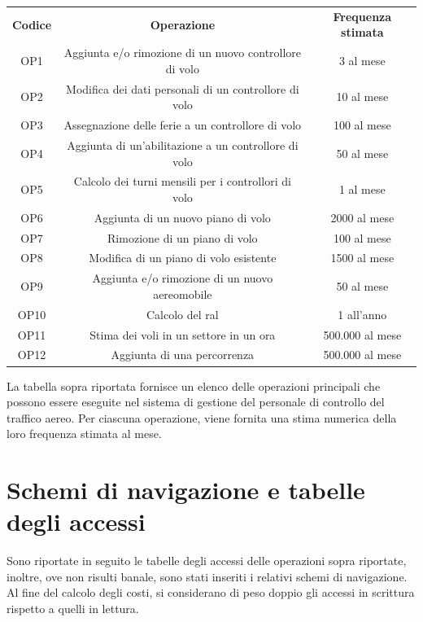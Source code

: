   \begin{table}[H]
  \centering
  \begin{tabular}{ccc}
  \rowcolor{tableheadercolor}
  \textbf{Codice} & \textbf{Operazione} & \textbf{Frequenza stimata} \\

  OP1 & Aggiunta e/o rimozione di un nuovo controllore di volo & 3 al mese \\
  OP2 & Modifica dei dati personali di un controllore di volo & 10 al mese \\
  OP3 & Assegnazione delle ferie a un controllore di volo & 100 al mese \\
  OP4 & Aggiunta di un'abilitazione a un controllore di volo & 50 al mese \\
  OP5 & Calcolo dei turni mensili per i controllori di volo & 1 al mese \\
  OP6 & Aggiunta di un nuovo piano di volo & 2000 al mese \\
  OP7 & Rimozione di un piano di volo & 100 al mese \\
  OP8 & Modifica di un piano di volo esistente & 1500 al mese \\
  OP9 & Aggiunta e/o rimozione di un nuovo aereomobile & 50 al mese \\
  OP10 & Calcolo del ral & 1 all'anno \\
  OP11 & Stima dei voli in un settore in un ora & 500.000 al mese \\
  OP12 & Aggiunta di una percorrenza & 500.000 al mese \\


  \end{tabular}
  \end{table}
  
  La tabella sopra riportata fornisce un elenco delle operazioni principali che possono essere eseguite nel sistema di gestione del personale di controllo del traffico aereo. Per ciascuna operazione, viene fornita una stima numerica della loro frequenza stimata al mese.
\section{Schemi di navigazione e tabelle degli accessi}
Sono riportate in seguito le tabelle degli accessi delle operazioni sopra riportate, inoltre, ove
non risulti banale, sono stati inseriti i relativi schemi di navigazione. Al fine del calcolo degli
costi, si considerano di peso doppio gli accessi in scrittura rispetto a quelli in lettura.

